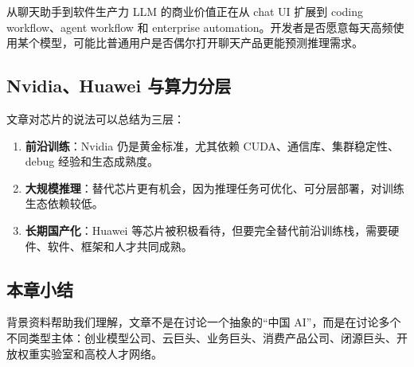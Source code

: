 \begin{importantbox}{从聊天助手到软件生产力}
LLM 的商业价值正在从 chat UI 扩展到 coding workflow、agent workflow 和 enterprise automation。开发者是否愿意每天高频使用某个模型，可能比普通用户是否偶尔打开聊天产品更能预测推理需求。
\end{importantbox}

\subsection{Nvidia、Huawei 与算力分层}

文章对芯片的说法可以总结为三层：

\begin{enumerate}[leftmargin=1.5em]
    \item \textbf{前沿训练}：Nvidia 仍是黄金标准，尤其依赖 CUDA、通信库、集群稳定性、debug 经验和生态成熟度。
    \item \textbf{大规模推理}：替代芯片更有机会，因为推理任务可优化、可分层部署，对训练生态依赖较低。
    \item \textbf{长期国产化}：Huawei 等芯片被积极看待，但要完全替代前沿训练栈，需要硬件、软件、框架和人才共同成熟。
\end{enumerate}

\subsection{本章小结}

背景资料帮助我们理解，文章不是在讨论一个抽象的``中国 AI''，而是在讨论多个不同类型主体：创业模型公司、云巨头、业务巨头、消费产品公司、闭源巨头、开放权重实验室和高校人才网络。


